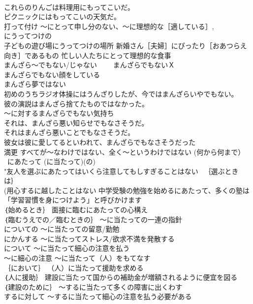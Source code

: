 \documentclass[8pt]{extreport}
\begin{document}
\begin{CJK}{UTF8}{min}
\\	これらのりんごは料理用にもってこいだ。 
\\	ピクニックにはもってこいの天気だ。 
\\	打って付け ～にとって申し分のない、～に理想的な［適している］, 
\\	にうってつけの
\\	子どもの遊び場にうってつけの場所 新婚さん［夫婦］にぴったり［おあつらえ向き］であるもの 忙しい人たちにとって理想的な食事
\\	まんざら～でもない/じゃない　　 まんざらでもないＸ	
\\	まんざらでもない顔をしている 
\\	まんざら夢ではない 
\\	初めのうちラジオ体操にはうんざりしたが、今ではまんざらいやでもない。 
\\	彼の演説はまんざら捨てたものではなかった。 
\\	～に対するまんざらでもない気持ち 
\\	それは、まんざら悪い知らせでもなさそうだ。 
\\	それはまんざら悪いことでもなさそうだ。 
\\	彼女は彼に愛してるといわれて、まんざらでもなさそうだった 
\\	満更	すべてが～なわけではない、全く～というわけではない (何から何まで）
\\	~にあたって (に当たって)(の)
\\	"友人を選ぶにあたってはいくら注意してもしすぎることはない 　｛選ぶときは｝ 
\\	(用心するに越したことはない 中学受験の勉強を始めるにあたって、多くの塾は「学習習慣を身につけよう」と呼びかけます 
\\	｛始めるとき｝ 面接に臨むにあたっての心構え　 
\\	｛臨むうえでの／臨むときの｝ ～に当たっての一連の指針 
\\	についての ～に当たっての留意/勤勉 
\\	にかんする ～に当たってストレス/欲求不満を発散する 
\\	について ～に当たって細心の注意を払う 
\\	～に細心の注意 ～に当たって（人）をもてなす 
\\	｛において｝ （人）に当たって援助を求める 
\\	｛人に援助｝ 建設に当たって国からの補助金が増額されるように便宜を図る 
\\	｛建設のために｝ ～するに当たって多くの障害に出くわす 
\\	するに対して ～するに当たって細心の注意を払う必要がある 

\end{CJK}
\end{document}
